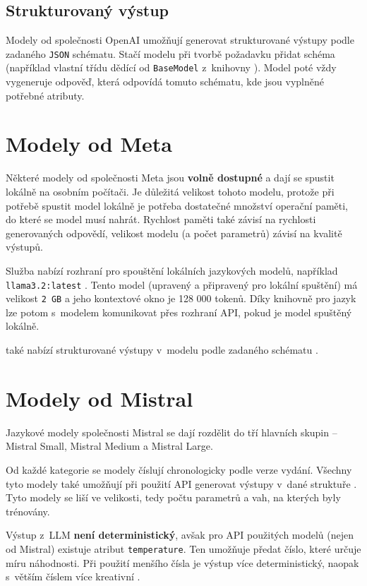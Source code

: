 \documentclass[czech, bc, kiv, he, iso690numb, pdf]{fasthesis}
\begin{document}
\subsection{Strukturovaný výstup}
Modely od společnosti OpenAI umožňují generovat strukturované výstupy \cite{openai-structured} podle zadaného \verb"JSON" schématu. Stačí modelu při tvorbě požadavku přidat schéma (například vlastní třídu dědící od \verb"BaseModel" z~knihovny  \cite{pydantic}). Model poté vždy vygeneruje odpověď, která odpovídá tomuto schématu, kde jsou vyplněné potřebné atributy.

\section{Modely od Meta}
Některé modely od společnosti Meta jsou \textbf{volně dostupné} a dají se spustit lokálně na osobním počítači. Je důležitá velikost tohoto modelu, protože při potřebě spustit model lokálně je potřeba dostatečné množství operační paměti, do které se model musí nahrát. Rychlost paměti také závisí na rychlosti generovaných odpovědí, velikost modelu (a počet parametrů) závisí na kvalitě výstupů.

Služba  nabízí rozhraní pro spouštění lokálních jazykových modelů, například \verb"llama3.2:latest" \cite{llm-llama}. Tento model (upravený a připravený pro lokální spuštění) má velikost \verb"2 GB" a jeho kontextové okno je 128 000 tokenů. Díky knihovně  pro jazyk  lze potom s~modelem komunikovat přes rozhraní API, pokud je model spuštěný lokálně.

 také nabízí strukturované výstupy v~modelu podle zadaného schématu \cite{ollama-structured}.

\section{Modely od Mistral}\label{sec:modely-od-mistral}
Jazykové modely společnosti Mistral se dají rozdělit do tří hlavních skupin -- Mistral Small, Mistral Medium a Mistral Large.

Od každé kategorie se modely číslují chronologicky podle verze vydání. Všechny tyto modely také umožňují při použití API generovat výstupy v~dané struktuře \cite{mistral-structured}. Tyto modely se liší ve velikosti, tedy počtu parametrů a vah, na kterých byly trénovány.

Výstup z~LLM \textbf{není deterministický}, avšak pro API použitých modelů (nejen od Mistral) existuje atribut \verb"temperature". Ten umožňuje předat číslo, které určuje míru náhodnosti. Při použití menšího čísla je výstup více deterministický, naopak s~větším číslem více kreativní \cite{mistral-temperature}.
\end{document}
